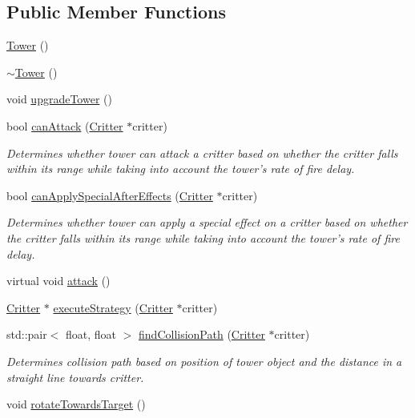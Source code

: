 \subsection*{Public Member Functions}
\begin{DoxyCompactItemize}
\item 
\hyperlink{class_tower_a1b785dc1e9fb979a10620ca183b5761d}{Tower} ()
\item 
\hyperlink{class_tower_a96972da33c287758c036c944eccdc5fe}{$\sim$\+Tower} ()
\item 
void \hyperlink{class_tower_a3ae303a04b27b7cb89ed478d492f1a64}{upgrade\+Tower} ()
\item 
bool \hyperlink{class_tower_a3bc66411a614f108ceaefd255bdb4179}{can\+Attack} (\hyperlink{class_critter}{Critter} $\ast$critter)
\begin{DoxyCompactList}\small\item\em Determines whether tower can attack a critter based on whether the critter falls within its range while taking into account the tower's rate of fire delay. \end{DoxyCompactList}\item 
bool \hyperlink{class_tower_aa4d0884a1fc45d6b47e8ed4a3cd23b34}{can\+Apply\+Special\+After\+Effects} (\hyperlink{class_critter}{Critter} $\ast$critter)
\begin{DoxyCompactList}\small\item\em Determines whether tower can apply a special effect on a critter based on whether the critter falls within its range while taking into account the tower's rate of fire delay. \end{DoxyCompactList}\item 
virtual void \hyperlink{class_tower_a9f067c2b9e5e6987f341704b8b098606}{attack} ()
\item 
\hyperlink{class_critter}{Critter} $\ast$ \hyperlink{class_tower_aa6950f72316cb57bbc8c32a9e332dff3}{execute\+Strategy} (\hyperlink{class_critter}{Critter} $\ast$critter)
\item 
std\+::pair$<$ float, float $>$ \hyperlink{class_tower_a3e68908edd23da1f69b78017e58c27eb}{find\+Collision\+Path} (\hyperlink{class_critter}{Critter} $\ast$critter)
\begin{DoxyCompactList}\small\item\em Determines collision path based on position of tower object and the distance in a straight line towards critter. \end{DoxyCompactList}\item 
void \hyperlink{class_tower_a7deaf3f9565d32468d3056fa5bcc43b0}{rotate\+Towards\+Target} ()

\end{DoxyCompactItemize}
